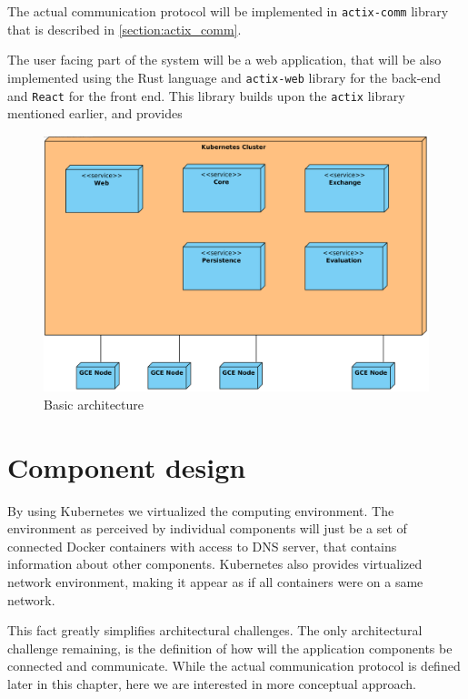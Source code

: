 The actual communication protocol will be implemented in \verb|actix-comm| library that is described in \autoref{section:actix_comm}.

The user facing part of the system will be a web application, that will be also implemented using the Rust language and
\verb|actix-web| library for the back-end and \verb|React| for the front end. This library builds upon the \verb|actix| library mentioned earlier, and provides


\begin{figure}[H]
    \includegraphics[width=\textwidth]{obrazky-figures/Deployment Diagram1.png}
    \caption{Basic architecture}
    \label{img:arch}
\end{figure}


\section{Component design}
By using Kubernetes we virtualized the computing environment. The environment as perceived by individual components
will just be a set of connected Docker containers with access to DNS server, that contains information about other components.
Kubernetes also provides virtualized network environment, making it appear as if all containers were on a same network.

This fact greatly simplifies architectural challenges. The only architectural challenge remaining, is the definition
of how will the application components be connected and communicate. While the actual communication protocol is
defined later in this chapter, here we are interested in more conceptual approach.

